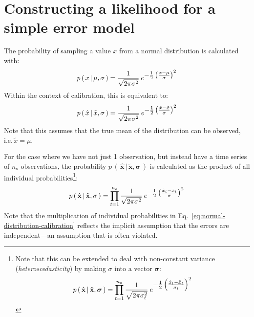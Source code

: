 \section{Constructing a likelihood for a simple error model}
The probability of sampling a value $x$ from a normal distribution  is calculated with:
\begin{equation}\label{eq:normal-distribution}
p\,(\,x\,|\,\mu,\sigma\,) = \frac{1}{\sqrt{2\pi\sigma^2}}\:e^\mathlarger{-\frac{1}{2}\left(\frac{x-\mu}{\sigma}\right)^2}
\end{equation}
Within the context of calibration, this is equivalent to:
\begin{equation}\label{eq:normal-distribution-calibration}
p\,(\,\hat{x}\,|\,\tilde{x},\sigma\,) = \frac{1}{\sqrt{2\pi\sigma^2}}\:e^\mathlarger{-\frac{1}{2}\left(\frac{\hat{x}-\tilde{x}}{\sigma}\right)^2}
\end{equation}
Note that this assumes that the true mean of the distribution can be observed, i.e.\,$\tilde{x}=\mu$.

For the case where we have not just 1 observation, but instead have a time series of $n_o$ observations, the probability $p\,(\,\hat{\mathbf{x}}\,|\,\tilde{\mathbf{x}},\boldsymbol\sigma\,)$ is calculated as the product of all individual probabilities\footnote{Note that this can be extended to deal with non-constant variance (\textit{heteroscedasticity}) by making $\sigma$ into a vector $\boldsymbol\sigma$:
\begin{equation}\label{eq:heteroscedastic-normal-distribution-calibration}
p\,(\,\hat{\mathbf{x}}\,|\,\tilde{\mathbf{x}},\boldsymbol\sigma\,) = \prod_{t=1}^{n_o} \frac{1}{\sqrt{2\pi\sigma_t^2}}\:e^\mathlarger{-\frac{1}{2}\left(\frac{\hat{x}_t-\tilde{x}_t}{\sigma_t}\right)^2}\nonumber
\end{equation}}:
\begin{equation}\label{eq:normal-distribution-calibration-prod}
p\,(\,\hat{\mathbf{x}}\,|\,\tilde{\mathbf{x}},\sigma\,) = \prod_{t=1}^{n_o} \frac{1}{\sqrt{2\pi\sigma^2}}\:e^\mathlarger{-\frac{1}{2}\left(\frac{\hat{x}_t-\tilde{x}_t}{\sigma}\right)^2}
\end{equation}
Note that the multiplication of individual probabilities in Eq.~\ref{eq:normal-distribution-calibration} reflects the implicit assumption that the errors are independent---an assumption that is often violated.


